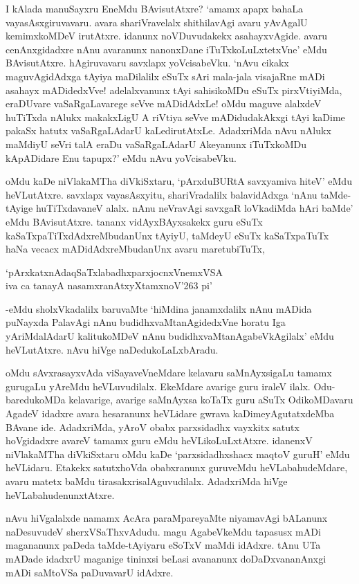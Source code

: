 I kAlada manuSayxru EneMdu BAvisutAtxre? `amamx apapx bahaLa vayasAsxgiruvavaru. avara shariVravelalx shithilavAgi avaru yAvAgalU kemimxkoMDeV irutAtxre. idanunx noVDuvudakekx asahayxvAgide. avaru cenAnxgidadxre nAnu avaranunx nanonxDane iTuTxkoLuLxtetxVne' eMdu BAvisutAtxre. hAgiruvavaru savxlapx yoVcisabeVku. `nAvu cikakx maguvAgidAdxga tAyiya maDilalilx eSuTx sAri mala-jala visajaRne mADi asahayx mADidedxVve! adelalxvanunx tAyi sahisikoMDu eSuTx pirxVtiyiMda, eraDUvare vaSaRgaLavarege seVve mADidAdxLe! oMdu maguve alalxdeV huTiTxda nAlukx makakxLigU A riVtiya seVve mADidudakAkxgi tAyi kaDime pakaSx hatutx vaSaRgaLAdarU kaLedirutAtxLe. AdadxriMda nAvu nAlukx maMdiyU seVri talA eraDu vaSaRgaLAdarU Akeyanunx iTuTxkoMDu kApADidare Enu tapupx?' eMdu nAvu yoVcisabeVku.

oMdu kaDe niVlakaMTha diVkiSxtaru, `pArxduBURtA savxyamiva hiteV' eMdu heVLutAtxre. savxlapx vayasAsxyitu, shariVradalilx balavidAdxga `nAnu taMde-tAyige huTiTxdavaneV alalx. nAnu neVravAgi savxgaR loVkadiMda hAri baMde' eMdu BAvisutAtxre. tananx vidAyxBAyxsakekx guru eSuTx kaSaTxpaTiTxdAdxreMbudanUnx tAyiyU, taMdeyU eSuTx kaSaTxpaTuTx haNa vecacx mADidAdxreMbudanUnx avaru maretubiTuTx,

\begin{shloka}
`pArxkatxnAdaqSaTxlabadhxparxjocnxVnemxVSA\\
iva ca tanayA nasamxranAtxyXtamxnoV\char'263 pi'
\end{shloka}

-eMdu sholxVkadalilx baruvaMte `hiMdina janamxdalilx nAnu mADida puNayxda PalavAgi nAnu budidhxvaMtanAgidedxVne horatu Iga yAriMdalAdarU kalitukoMDeV nAnu budidhxvaMtanAgabeVkAgilalx' eMdu heVLutAtxre. nAvu hiVge naDedukoLaLxbAradu.

oMdu sAvxrasayxvAda viSayaveVneMdare kelavaru saMnAyxsigaLu tamamx gurugaLu yAreMdu heVLuvudilalx. EkeMdare avarige guru iraleV ilalx. Odu-baredukoMDa kelavarige, avarige saMnAyxsa koTaTx guru aSuTx OdikoMDavaru AgadeV idadxre avara hesaranunx heVLidare gwrava kaDimeyAgutatxdeMba BAvane ide. AdadxriMda, yAroV obabx parxsidadhx vayxkitx satutx hoVgidadxre avareV tamamx guru eMdu heVLikoLuLxtAtxre. idanenxV niVlakaMTha diVkiSxtaru oMdu kaDe `parxsidadhxshacx maqtoV guruH' eMdu heVLidaru. Etakekx satutxhoVda obabxranunx guruveMdu heVLabahudeMdare, avaru matetx baMdu tirasakxrisalAguvudilalx. AdadxriMda hiVge heVLabahudenunxtAtxre.

nAvu hiVgalalxde namamx AcAra paraMpareyaMte niyamavAgi bALanunx naDesuvudeV sherxVSaThxvAdudu. magu AgabeVkeMdu tapasusx mADi magananunx paDeda taMde-tAyiyaru eSoTxV maMdi idAdxre. tAnu UTa mADade idadxrU maganige tininxsi beLasi avananunx doDaDxvananAnxgi mADi saMtoVSa paDuvavarU idAdxre.


